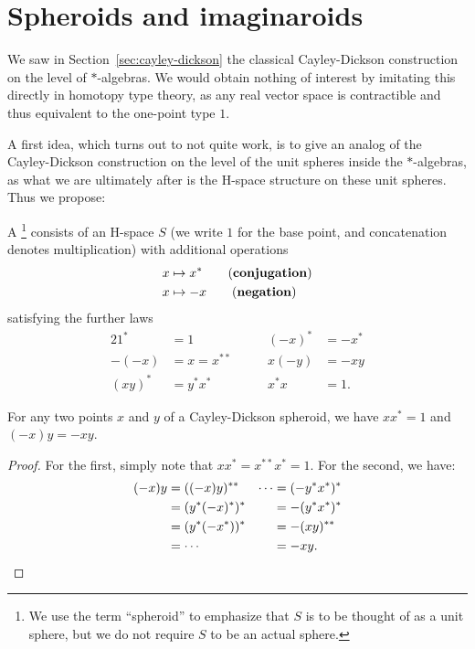 \section{Spheroids and imaginaroids}
\label{sec:imaginaroids}

We saw in Section~\ref{sec:cayley-dickson} the classical
Cayley-Dickson construction on the level of $*$-algebras. We would obtain nothing
of interest by imitating this directly in homotopy type theory, as any real vector
space is contractible and thus equivalent to the one-point type $1$.

A first idea, which turns out to not quite work, is to give an
analog of the Cayley-Dickson construction on the level of the unit
spheres inside the $*$-algebras, as what we are ultimately after is the
H-space structure on these unit spheres. Thus we propose:
\begin{defn}
  A \footnote{We use the term
    ``spheroid'' to emphasize that $S$ is to be thought of as a unit
    sphere, but we do not require $S$ to be an actual sphere.}
  consists of an H-space
  $S$ (we write $1$ for the base point, and concatenation denotes 
  multiplication) with additional operations
\begin{align*}
x &\mapsto x^\ast \tag{\define{conjugation}} \\
x &\mapsto -x \tag{\define{negation}}
\end{align*}
satisfying the further laws
\begin{alignat*}2
  1^* &= 1           &\qquad   (-x)^* &= -x^* \\
  -(-x)&= x = x^{**} &\qquad   x(-y) & = -xy  \\
  (xy)^* &= y^*x^*   &\qquad   x^* x & =1.
\end{alignat*}
\end{defn}

\begin{lem}
For any two points $x$ and $y$ of a Cayley-Dickson spheroid, we have
$xx^\ast=1$ and $(-x)y=-xy$.
\end{lem}

\begin{proof}
  For the first, simply note that $xx^\ast=x^{**}x^*=1$. For the
  second, we have:
  \begin{align*}
    (-x)y & =((-x)y)^{**} & \cdots & =(-y^*x^*)^*\\
          & =(y^*(-x)^*)^* & & =-(y^*x^*)^*\\
          & =(y^*(-x^*))^* & & =-(xy)^{**}\\
          & =\cdots & & =-xy.\qedhere
  \end{align*}
\end{proof}

